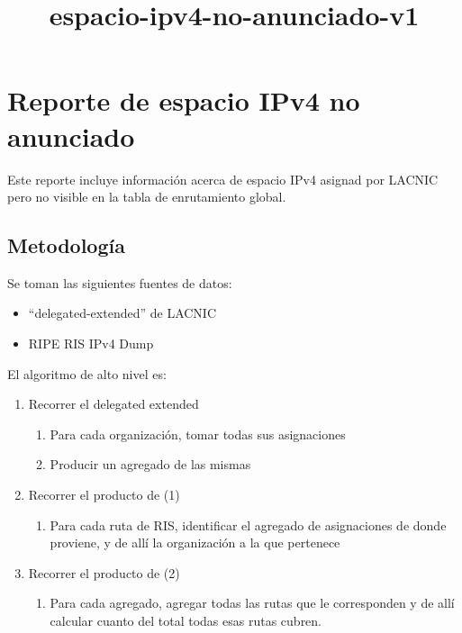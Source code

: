 \documentclass[11pt]{article}
\title{espacio-ipv4-no-anunciado-v1}
\providecommand{\tightlist}{%
      \setlength{\itemsep}{0pt}\setlength{\parskip}{0pt}}
\begin{document}
    
    
    \maketitle
    
    

    
    \hypertarget{reporte-de-espacio-ipv4-no-anunciado}{%
\section{Reporte de espacio IPv4 no
anunciado}\label{reporte-de-espacio-ipv4-no-anunciado}}

Este reporte incluye información acerca de espacio IPv4 asignad por
LACNIC pero no visible en la tabla de enrutamiento global.

\hypertarget{metodologuxeda}{%
\subsection{Metodología}\label{metodologuxeda}}

Se toman las siguientes fuentes de datos:

\begin{itemize}
\tightlist
\item
  ``delegated-extended'' de LACNIC
\item
  RIPE RIS IPv4 Dump
\end{itemize}

El algoritmo de alto nivel es:

\begin{enumerate}
\def\labelenumi{\arabic{enumi}.}
\tightlist
\item
  Recorrer el delegated extended

  \begin{enumerate}
  \def\labelenumii{\arabic{enumii}.}
  \tightlist
  \item
    Para cada organización, tomar todas sus asignaciones
  \item
    Producir un agregado de las mismas
  \end{enumerate}
\item
  Recorrer el producto de (1)

  \begin{enumerate}
  \def\labelenumii{\arabic{enumii}.}
  \tightlist
  \item
    Para cada ruta de RIS, identificar el agregado de asignaciones de
    donde proviene, y de allí la organización a la que pertenece
  \end{enumerate}
\item
  Recorrer el producto de (2)

  \begin{enumerate}
  \def\labelenumii{\arabic{enumii}.}
  \tightlist
  \item
    Para cada agregado, agregar todas las rutas que le corresponden y de
    allí calcular cuanto del total todas esas rutas cubren.
  \end{enumerate}
\end{enumerate}
\end{document}
